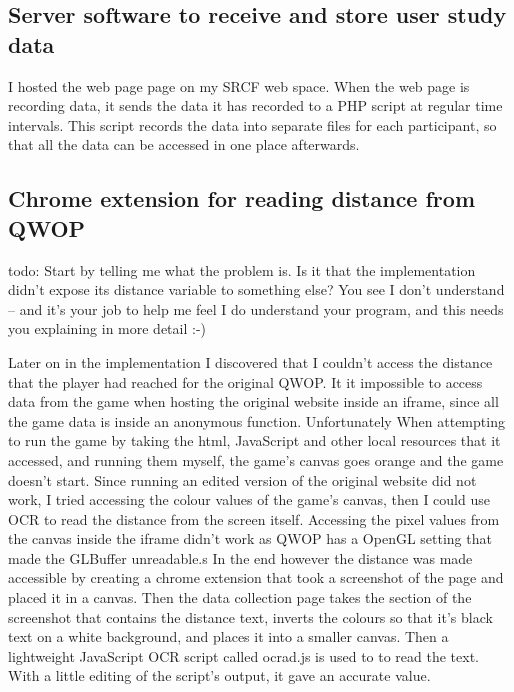 \documentclass[12pt,a4paper,twoside,openright]{report}
\begin{document}
	\userStudySections

    \subsection{Server software to receive and store user study data}
    \label{sec:serverSoftware}


    I hosted the web page page on my SRCF web space. When the web page is recording data, it sends the data it has recorded to a PHP script at regular time intervals. This script records the data into separate files for each participant, so that all the data can be accessed in one place afterwards.

    \subsection{Chrome extension for reading distance from QWOP}
    \label{sec:chromeExtension}

todo: Start by telling me what the problem is.  Is it that the implementation didn't expose its distance variable to something else? You see I don't understand -- and it's your job to help me feel I do understand your program, and this needs you explaining in more detail :-)

    Later on in the implementation I discovered that I couldn't access the distance that the player had reached for the original QWOP. It it impossible to access data from the game when hosting the original website inside an iframe, since all the game data is inside an anonymous function.
    Unfortunately When attempting to run the game by taking the html, JavaScript and other local resources that it accessed, and running them myself, the game's canvas goes orange and the game doesn't start.
    Since running an edited version of the original website did not work, I tried accessing the colour values of the game's canvas, then I could use OCR to read the distance from the screen itself. Accessing the pixel values from the canvas inside the iframe didn't work as QWOP has a OpenGL setting that made the GLBuffer unreadable.s
    In the end however the distance was made accessible by creating a chrome extension that took a screenshot of the page and placed it in a canvas. Then the data collection page takes the section of the screenshot that contains the distance text, inverts the colours so that it's black text on a white background, and places it into a smaller canvas. Then a lightweight JavaScript OCR script called ocrad.js is used to to read the text. With a little editing of the script's output, it gave an accurate value.
\end{document}
